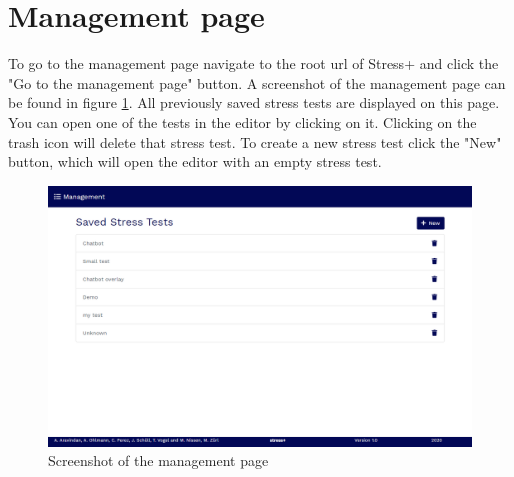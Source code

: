 \section{Management page}
\label{sec:management-page}

To go to the management page navigate to the root url of Stress+ and click the "Go to the management page" button.
A screenshot of the management page can be found in figure \ref{fig:screenshot-management-page}.
All previously saved stress tests are displayed on this page.
You can open one of the tests in the editor by clicking on it.
Clicking on the trash icon will delete that stress test.
To create a new stress test click the "New" button, which will open the editor with an empty stress test.

\begin{figure}[htb]
    \centering
    \includegraphics[width=\textwidth]{figures/screenshot-management-page.png}
    \caption{Screenshot of the management page}
    \label{fig:screenshot-management-page}
\end{figure}
